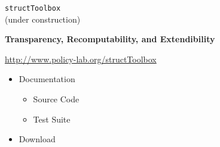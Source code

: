 \begin{frame}[fragile]
\begin{center}\huge
\verb+structToolbox+\\\vspace{-0.5cm}
{\normalsize (under construction)}
\end{center}
\end{frame}


\begin{frame}
\textbf{Transparency, Recomputability, and Extendibility}

\begin{center}\Large
\href{http://www.policy-lab.org/structToolbox}{http://www.policy-lab.org/structToolbox}
\end{center}

\begin{itemize}
\item Documentation\vspace{0.2cm}
\begin{itemize}
\item Source Code\vspace{0.2cm}
\item Test Suite\vspace{0.2cm}
\end{itemize}
\item Download
\end{itemize}

\end{frame}